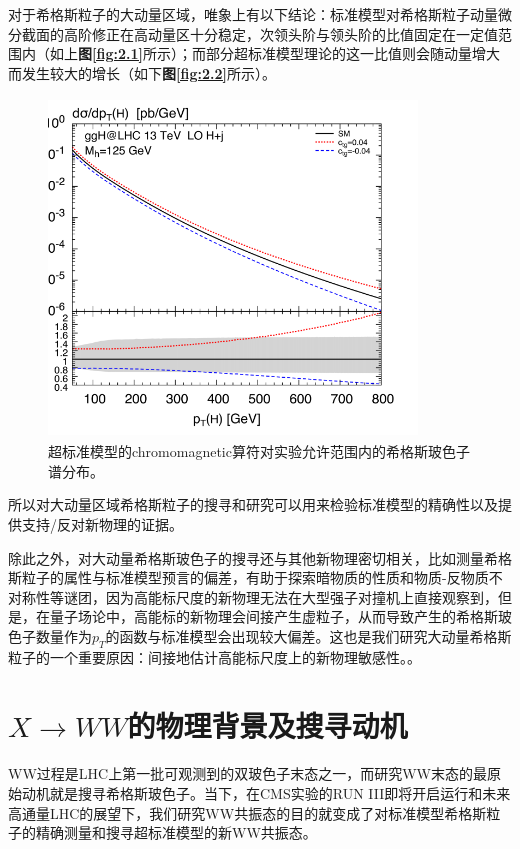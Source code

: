对于希格斯粒子的大动量区域，唯象上有以下结论\cite{Higgs_high_pt}：标准模型对希格斯粒子动量微分截面的高阶修正在高动量区十分稳定，次领头阶与领头阶的比值固定在一定值范围内（如上\textbf{图\ref{fig:2.1}}所示）；而部分超标准模型理论\cite{Higgs_high_pt_BSM}的这一比值则会随动量增大而发生较大的增长（如下\textbf{图\ref{fig:2.2}}所示）。
\begin{figure}[H]
 \centering
 \includegraphics[height=9cm, width=9.8cm]{pictures/BSM_NLO:LO.png}
  \caption{超标准模型的chromomagnetic算符对实验允许范围内的希格斯玻色子谱分布。\cite{Higgs_high_pt_BSM}}
 \label{fig:2.3}
\end{figure}
所以对大动量区域希格斯粒子的搜寻和研究可以用来检验标准模型的精确性以及提供支持/反对新物理的证据。

除此之外，对大动量希格斯玻色子的搜寻还与其他新物理密切相关，比如测量希格斯粒子的属性与标准模型预言的偏差，有助于探索暗物质的性质和物质-反物质不对称性等谜团，因为高能标尺度的新物理无法在大型强子对撞机上直接观察到，但是，在量子场论中，高能标的新物理会间接产生虚粒子，从而导致产生的希格斯玻色子数量作为$p_T$的函数与标准模型会出现较大偏差。这也是我们研究大动量希格斯粒子的一个重要原因：间接地估计高能标尺度上的新物理敏感性。。

\section{$X\to WW$的物理背景及搜寻动机}
WW过程是LHC上第一批可观测到的双玻色子末态之一，而研究WW末态的最原始动机就是搜寻希格斯玻⾊⼦。当下，在CMS实验的RUN III即将开启运行和未来高通量LHC的展望下，我们研究WW共振态的目的就变成了对标准模型希格斯粒子的精确测量和搜寻超标准模型的新WW共振态。
